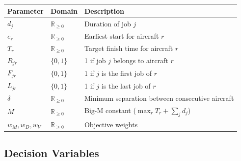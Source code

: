 \begin{center}
\begin{tabular}{lll}
\toprule
Parameter & Domain & Description \\
\midrule
$d_j$ & $\mathbb{R}_{\geq 0}$ & Duration of job $j$ \\
$e_r$ & $\mathbb{R}_{\geq 0}$ & Earliest start for aircraft $r$ \\
$T_r$ & $\mathbb{R}_{\geq 0}$ & Target finish time for aircraft $r$ \\
$R_{jr}$ & $\{0,1\}$ & 1 if job $j$ belongs to aircraft $r$ \\
$F_{jr}$ & $\{0,1\}$ & 1 if $j$ is the first job of $r$ \\
$L_{jr}$ & $\{0,1\}$ & 1 if $j$ is the last job of $r$ \\
$\delta$ & $\mathbb{R}_{\geq 0}$ & Minimum separation between consecutive aircraft \\
$M$ & $\mathbb{R}_{\geq 0}$ & Big-M constant ($\max_r T_r + \sum_j d_j$) \\
$w_M, w_D, w_V$ & $\mathbb{R}_{\geq 0}$ & Objective weights \\
\bottomrule
\end{tabular}
\end{center}

\subsection{Decision Variables}

